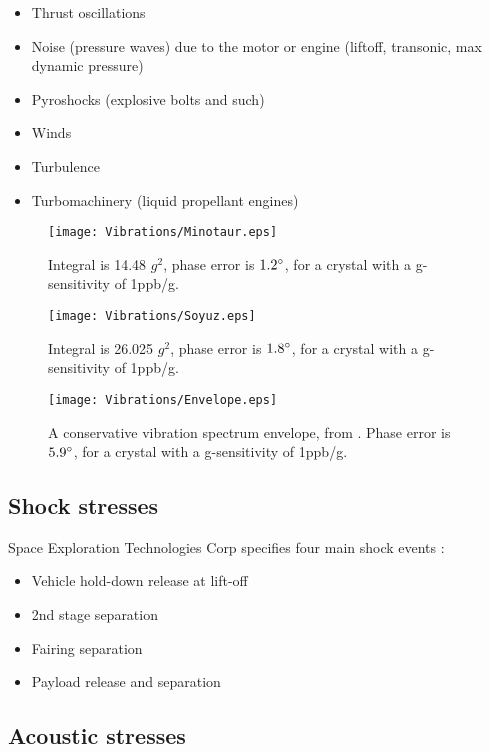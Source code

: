 \begin{itemize}
\item{Thrust oscillations\cite{NASAVibrations}}
\item{Noise (pressure waves) due to the motor or
engine (liftoff, transonic, max dynamic pressure)\cite{NASAVibrations}}
\item{Pyroshocks (explosive bolts and such)\cite{HarveyMudd}}
\item{Winds\cite{HarveyMudd}}
\item{Turbulence\cite{HarveyMudd}}
\item{Turbomachinery (liquid propellant engines)\cite{HarveyMudd}}
\end{itemize}

\begin{figure}[!htb] 
    \centering
    \texttt{[image: Vibrations/Minotaur.eps]} 
    \caption{Integral is 14.48 $g^2$, phase error is $1.2\degree$, for a crystal with a g-sensitivity of  1ppb/g.}
    \label{fig:MinotaurVibrations}
\end{figure}


\begin{figure}[!htb] 
    \centering
    \texttt{[image: Vibrations/Soyuz.eps]} 
    \caption{Integral is 26.025 $g^2$, phase error is $1.8\degree$, for a crystal with a g-sensitivity of  1ppb/g.}
    \label{fig:SoyuzVibrations}
\end{figure}

\begin{figure}[!htb] 
    \centering
    \texttt{[image: Vibrations/Envelope.eps]} 
    \caption{A conservative vibration spectrum envelope, from \cite{VibrationHandout}. Phase error is $5.9\degree$, for a crystal with a g-sensitivity of  1ppb/g.}
    \label{fig:ConservativeVibrations}
\end{figure}



\subsection{Shock stresses}
Space Exploration Technologies Corp  specifies four main shock events
\cite{Falcon9}: 
\begin{itemize}
\item{Vehicle hold-down release at lift-off} 
\item{2nd stage separation}
\item{Fairing separation}
\item{Payload release and separation}
\end{itemize}

\subsection{Acoustic stresses}
